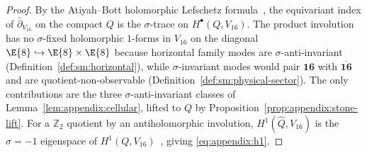 \begin{proof}
By the Atiyah--Bott holomorphic Lefschetz formula~\cite{AtiyahBott1966}, the
equivariant index of $\bar\partial_{V_{16}}$ on the compact $Q$ is the
$\sigma$-trace on $H^\bullet(Q,V_{16})$. The product involution has no
$\sigma$-fixed holomorphic $1$-forms in $V_{16}$ on the diagonal
$\E{8}\hookrightarrow\E{8}\times\E{8}$ because horizontal family modes are
$\sigma$-anti-invariant (Definition~\ref{def:sm:horizontal}), while
$\sigma$-invariant modes would pair $\mathbf{16}$ with $\overline{\mathbf{16}}$
and are quotient-non-observable (Definition~\ref{def:sm:physical-sector}). The only contributions are the
three $\sigma$-anti-invariant classes of
Lemma~\ref{lem:appendix:cellular}, lifted to $Q$ by
Proposition~\ref{prop:appendix:stone-lift}. For a $\mathbb{Z}_2$ quotient by an
antiholomorphic involution, $H^1(\hat Q,V_{16})$ is the $\sigma=-1$ eigenspace
of $H^1(Q,V_{16})$~\cite{AtiyahBott1966}, giving \eqref{eq:appendix:h1}.
\end{proof}